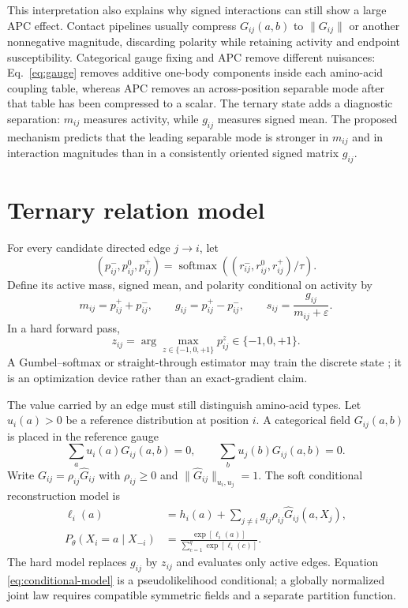\documentclass[10pt,twocolumn]{article}
\newcommand{\1}{\mathbf 1}
\theoremstyle{remark}
\begin{document}
This interpretation also explains why signed interactions can still show a large APC effect.
Contact pipelines usually compress $G_{ij}(a,b)$ to $\|G_{ij}\|$ or another nonnegative magnitude,
discarding polarity while retaining activity and endpoint susceptibility.  Categorical gauge
fixing and APC remove different nuisances: Eq.~\ref{eq:gauge} removes additive one-body components
inside each amino-acid coupling table, whereas APC removes an across-position separable mode after
that table has been compressed to a scalar.  The ternary state adds a diagnostic separation:
$m_{ij}$ measures activity, while $g_{ij}$ measures signed mean.  The proposed mechanism predicts
that the leading separable mode is stronger in $m_{ij}$ and in interaction magnitudes than in a
consistently oriented signed matrix $g_{ij}$.

\section{Ternary relation model}

For every candidate directed edge $j\to i$, let
\begin{equation}
(p_{ij}^{-},p_{ij}^{0},p_{ij}^{+})
=\operatorname{softmax}
\left((r_{ij}^{-},r_{ij}^{0},r_{ij}^{+})/\tau\right).
\label{eq:state-softmax}
\end{equation}
Define its active mass, signed mean, and polarity conditional on activity by
\begin{equation}
m_{ij}=p_{ij}^{+}+p_{ij}^{-},\qquad
g_{ij}=p_{ij}^{+}-p_{ij}^{-},\qquad
s_{ij}=\frac{g_{ij}}{m_{ij}+\varepsilon}.
\label{eq:activity-polarity}
\end{equation}
In a hard forward pass,
\begin{equation}
z_{ij}=\arg\max_{z\in\{-1,0,+1\}}p_{ij}^{z}
\in\{-1,0,+1\}.
\label{eq:hard-state}
\end{equation}
A Gumbel--softmax or straight-through estimator may train the discrete state
\cite{jang2017,maddison2017}; it is an optimization device rather than an exact-gradient claim.

The value carried by an edge must still distinguish amino-acid types.  Let $u_i(a)>0$ be a
reference distribution at position $i$.  A categorical field $G_{ij}(a,b)$ is placed in the
reference gauge
\begin{equation}
\sum_a u_i(a)G_{ij}(a,b)=0,
\qquad
\sum_b u_j(b)G_{ij}(a,b)=0.
\label{eq:gauge}
\end{equation}
Write $G_{ij}=\rho_{ij}\widehat G_{ij}$ with $\rho_{ij}\geq0$ and
$\|\widehat G_{ij}\|_{u_i,u_j}=1$.  The soft conditional reconstruction model is
\begin{align}
\ell_i(a)
&=h_i(a)+\sum_{j\ne i}g_{ij}\rho_{ij}
\widehat G_{ij}(a,X_j),
\label{eq:conditional-logit}\\
P_\theta(X_i=a\mid X_{-i})
&=\frac{\exp[\ell_i(a)]}
{\sum_{c=1}^{q}\exp[\ell_i(c)]}.
\label{eq:conditional-model}
\end{align}
The hard model replaces $g_{ij}$ by $z_{ij}$ and evaluates only active edges.  Equation
\ref{eq:conditional-model} is a pseudolikelihood conditional; a globally normalized joint law
requires compatible symmetric fields and a separate partition function.
\end{document}
